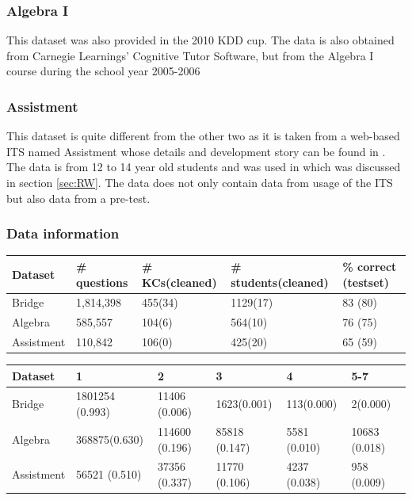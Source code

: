 \documentclass{scrartcl}
\begin{document}
\subsubsection{Algebra I}
This dataset was also provided in the 2010 KDD cup. The data is also obtained from Carnegie Learnings' Cognitive Tutor Software, but from the Algebra I course during the school year 2005-2006 \cite{algebra}

\subsubsection{Assistment}
This dataset is quite different from the other two as it is taken from a web-based ITS named Assistment whose details and development story can be found in \cite{razzaq}. The data is from 12 to 14 year old students and was used in \cite{ktpfa} which was discussed in section \ref{sec:RW}. The data does not only contain data from usage of the ITS but also data from a pre-test.

\subsubsection{Data information}
\begin{table}
    \begin{tabular}{| l | l | l | l |l|}
    \hline
    Dataset & \# questions & \# KCs(cleaned) &\# students(cleaned) & \% correct (testset) \\ \hline
    Bridge & 1,814,398 & 455(34) & 1129(17) & 83 (80)\\ \hline
    Algebra & 585,557 & 104(6) & 564(10) &  76 (75)\\ \hline
    Assistment & 110,842  & 106(0) & 425(20) & 65 (59)\\
    \hline
    \end{tabular}
\end{table} 
   
\begin{table}
	\begin{tabular}{| l | l | l | l |l | l |}
    \hline
    Dataset & 1 & 2 & 3 & 4 & 5-7\\ \hline
    Bridge & 1801254 (0.993) & 11406 (0.006) & 1623(0.001)&113(0.000)&2(0.000) \\ \hline
    Algebra & 368875(0.630)  & 114600 (0.196) & 85818 (0.147)&5581 (0.010)&10683 (0.018) \\ \hline
    Assistment & 56521 (0.510) & 37356 (0.337) & 11770 (0.106) & 4237 (0.038)&958 (0.009)\\
    \hline
    \end{tabular}
\end{table}  
\end{document}
